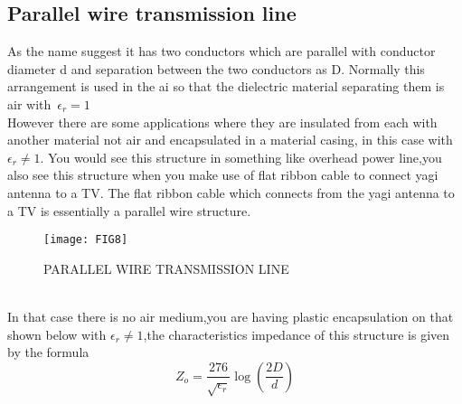 \subsection{Parallel wire transmission line} 
As the name suggest it has two conductors which are parallel with conductor diameter d and separation between the two conductors as D. Normally this arrangement is used in the ai so that the dielectric material separating them is air with\ $\epsilon_r=1$\\
However  there are some applications where they are insulated from each with another material not air and encapsulated in a material casing, in this case with $\epsilon_r\neq1$.
You would see this structure in something like overhead power line,you also see this structure when you make use of flat ribbon cable to connect yagi antenna to a TV. The flat ribbon cable which connects from the yagi antenna to a TV is essentially a parallel wire structure.
\begin{figure}[h]
	\centering
	\texttt{[image: FIG8]}
	\caption{PARALLEL WIRE TRANSMISSION LINE}
\end{figure}\\


In that case there is no air medium,you are having plastic encapsulation on that shown below with  $\epsilon_r\neq1$,the characteristics impedance of this structure is given by the formula 
\begin{equation*}
Z_o=\dfrac{276}{\sqrt{\epsilon_r}}\log(\dfrac{2D}{d})
\end{equation*}

